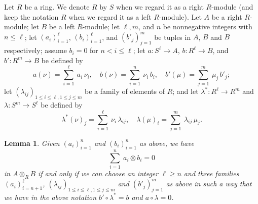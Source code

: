 \documentclass[12pt]{article}
\newtheorem{lem}[thm]{Lemma}
\theoremstyle{remark}
\theoremstyle{definition}
\begin{document}
Let $R$ be a ring. We denote $R$ by $S$ when we regard it as a right $R$-module (and keep the notation $R$ when we regard it as a left $R$-module). Let $A$ be a right $R$-module; let $B$ be a left $R$-module; let $\ell,m$, and $n$ be nonnegative integers with $n\le\ell$; let $(a_i)_{i=1}^\ell$, $(b_i)_{i=1}^\ell$, and $(b'_j)_{j=1}^m$ be tuples in $A$, $B$ and $B$ respectively; assume $b_i=0$ for $n<i\le\ell$; let $a:S^\ell\to A$, $b:R^\ell\to B$, and $b':R^m\to B$ be defined by 
$$
a(\nu)=\sum_{i=1}^\ell\ a_i\,\nu_i,\quad b(\nu)=\sum_{i=1}^n\ \nu_i\,b_i,\quad b'(\mu)=\sum_{j=1}^m\ \mu_j\,b'_j;
$$ 
let $(\lambda_{ij})_{1\le i\le\ell,1\le j\le m}$ be a family of elements of $R$; and let $\lambda^*:R^\ell\to R^m$ and $\lambda:S^m\to S^\ell$ be defined by 
$$
\lambda^*(\nu)_j=\sum_{i=1}^\ell\ \nu_i\,\lambda_{ij},\quad
\lambda(\mu)_i=\sum_{j=1}^m\ \lambda_{ij}\,\mu_j.
$$
%
\begin{lem}\label{techlem}
Given $(a_i)_{i=1}^n$ and $(b_i)_{i=1}^n$ as above, we have 
%
\begin{equation}\label{et=0}
\sum_{i=1}^n\ a_i\otimes b_i=0
\end{equation}
%
in $A\otimes_RB$ if and only if we can choose an integer $\ell\ge n$ and three families $(a_i)_{i=n+1}^\ell$, $(\lambda_{ij})_{1\le i\le\ell,1\le j\le m}$ and $(b'_j)_{j=1}^m$ as above in such a way that we have in the above notation $b'\circ\lambda^*=b$ and $a\circ\lambda=0$.
\end{lem}
%
\end{document}
